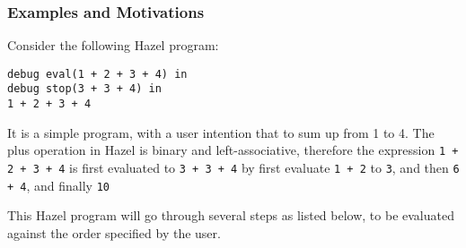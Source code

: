 
\subsubsection{Examples and Motivations}\label{sec:filter_example}

Consider the following Hazel program:
\lstset{xleftmargin=1in}
\begin{lstlisting}[language=hazel,caption={A simple Hazel program}]
debug eval(1 + 2 + 3 + 4) in
debug stop(3 + 3 + 4) in
1 + 2 + 3 + 4\end{lstlisting}

It is a simple program, with a user intention that to sum up from 1 to
4. The plus operation in Hazel is binary and left-associative,
therefore the expression \lstinline[language=hazel]{1 + 2 + 3 + 4} is
first evaluated to \lstinline[language=hazel]{3 + 3 + 4} by first
evaluate \lstinline[language=hazel]{1 + 2} to
\lstinline[language=hazel]{3}, and then
\lstinline[langauge=hazel]{6 + 4}, and finally
\lstinline[language=hazel]{10}

This Hazel program will go through several steps as listed below, to
be evaluated against the order specified by the user.

